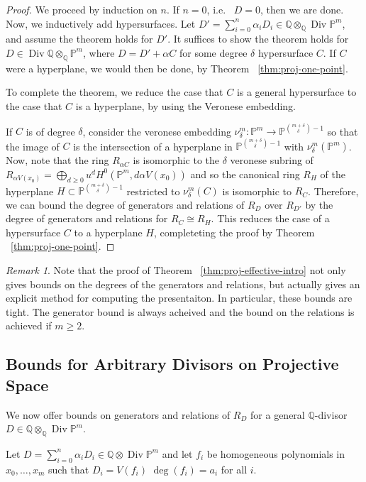 \documentclass{amsart}
\theoremstyle{plain}
\theoremstyle{definition}
\theoremstyle{remark}
\newtheorem{rem}[thm]{Remark}
\numberwithin{equation}{section}
\newcommand\ssec{\subsection}
\newcommand\bq{{\mathbb Q}}
\newcommand\bp{{\mathbb P}}
\DeclareMathOperator\di{Div}
\newcommand\pdeg{\delta}
\begin{document}
\restateeffective*


\begin{proof}
We proceed by induction on $n$.
If $n = 0$, i.e.~ $D = 0$, then we are done.
Now, we inductively add hypersurfaces.
Let $D' = \sum_{i = 0}^{n} \alpha_i D_i \in \bq \otimes_\bq\di \bp^m$, 
and assume the theorem holds for $D'$. It suffices to show
the theorem holds for $D \in \di \bq \otimes_\bq \bp^m$, where $D = D' + \alpha C$ for some
degree $\pdeg$ hypersurface $C$.
If $C$ were a hyperplane, we would then be done, by Theorem ~\ref{thm:proj-one-point}.

To complete the theorem, we reduce the case that $C$ is a general hypersurface
to the case that $C$ is a hyperplane, by using the Veronese embedding.

If $C$ is of degree $\pdeg$, consider the veronese embedding
$\nu_\pdeg^m: \bp^m \rightarrow \bp^{\binom{m+\pdeg}{\pdeg}-1}$
so that the image of $C$ is the intersection of 
a hyperplane in $\bp^{\binom{{m + \pdeg}}{\pdeg} - 1}$ with $\nu_\pdeg^m(\bp^m)$.
Now, note that the ring $R_{\alpha C}$ is isomorphic to the
$\pdeg$ veronese subring of $R_{\alpha V(x_0)} = \bigoplus_{d \geq 0} u^d H^0(\bp^m, d \alpha V(x_0))$ and so
the canonical ring $R_H$ of the hyperplane $H \subset \bp^{\binom{m+\pdeg}{\pdeg}-1}$
restricted to $\nu_\pdeg^m(C)$ is isomorphic to $R_C$.
Therefore, we can bound the degree of generators and relations of
$R_D$ over $R_{D'}$ by the degree of generators and
relations for $R_C \cong R_H.$
This reduces the case of a hypersurface $C$ to
a hyperplane $H$, completeting the proof by Theorem
~\ref{thm:proj-one-point}.
\end{proof}

\begin{rem}
\label{rem:exact-effective-bounds}
Note that the proof of Theorem ~\ref{thm:proj-effective-intro} not only gives bounds on the degrees of the generators and relations, but actually gives an explicit method for computing the presentaiton. In particular, these bounds are tight. The generator bound is always acheived and the bound on the relations is achieved if $m \geq 2$.
\end{rem}



\ssec{Bounds for Arbitrary Divisors on Projective Space}


We now offer bounds on generators and relations of $R_D$ for a general $\bq$-divisor $D \in \bq \otimes_\bq \di \bp^m$.

Let $D = \sum_{i=0}^n \alpha_i D_i \in \bq \otimes \di \bp^m$ and let $f_i$ be
homogeneous polynomials in $x_0, \ldots, x_m$ such that $D_i = V(f_i)$
$\deg(f_i) = a_i$ for all $i$. 
\end{document}
